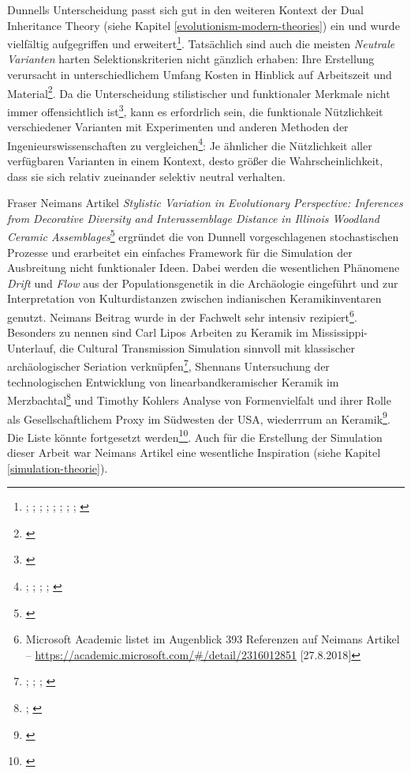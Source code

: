 \documentclass[openany,twoside,twocolumn]{book}
\let\rmarkdownfootnote\footnote%
\def\footnote{\protect\rmarkdownfootnote}
\begin{document}
Dunnells Unterscheidung passt sich gut in den weiteren Kontext der Dual
Inheritance Theory (siehe Kapitel \ref{evolutionism-modern-theories})
ein und wurde vielfältig aufgegriffen und erweitert\footnote{\textcite{lipo_population_1997};
  \textcite{lipo_science_2001}; \textcite{lyman_measuring_2000};
  \textcite{neiman_conspicuous_1997-1};
  \textcite{neiman_stylistic_1995}; \textcite{rindos_darwinian_1985};
  \textcite{rindos_undirected_1989}; \textcite{shennan_ceramic_2001};
  \textcite{teltser_culture_1995}}. Tatsächlich sind auch die meisten
\emph{Neutrale Varianten} harten Selektionskriterien nicht gänzlich
erhaben: Ihre Erstellung verursacht in unterschiedlichem Umfang Kosten
in Hinblick auf Arbeitszeit und Material\footnote{\textcite{meltzer_study_1981}}.
Da die Unterscheidung stilistischer und funktionaler Merkmale nicht
immer offensichtlich ist\footnote{\textcite{bettinger_style_1996}}, kann
es erfordrlich sein, die funktionale Nützlichkeit verschiedener
Varianten mit Experimenten und anderen Methoden der
Ingenieurswissenschaften zu vergleichen\footnote{\textcite{kornbacher_building_2001};
  \textcite{obrien_evolutionary_1994}; \textcite{obrien_variation_1990};
  \textcite{pfeffer_engineering_2001-1};
  \textcite{wilhelmsen_building_2001}}: Je ähnlicher die Nützlichkeit
aller verfügbaren Varianten in einem Kontext, desto größer die
Wahrscheinlichkeit, dass sie sich relativ zueinander selektiv neutral
verhalten.

Fraser Neimans Artikel \emph{Stylistic Variation in Evolutionary
Perspective: Inferences from Decorative Diversity and Interassemblage
Distance in Illinois Woodland Ceramic Assemblages}\footnote{\textcite{neiman_stylistic_1995}}
ergründet die von Dunnell vorgeschlagenen stochastischen Prozesse und
erarbeitet ein einfaches Framework für die Simulation der Ausbreitung
nicht funktionaler Ideen. Dabei werden die wesentlichen Phänomene
\emph{Drift} und \emph{Flow} aus der Populationsgenetik in die
Archäologie eingeführt und zur Interpretation von Kulturdistanzen
zwischen indianischen Keramikinventaren genutzt. Neimans Beitrag wurde
in der Fachwelt sehr intensiv rezipiert\footnote{Microsoft Academic
  listet im Augenblick 393 Referenzen auf Neimans Artikel --
  \url{https://academic.microsoft.com/\#/detail/2316012851}
  {[}27.8.2018{]}}. Besonders zu nennen sind Carl Lipos Arbeiten zu
Keramik im Mississippi-Unterlauf, die Cultural Transmission Simulation
sinnvoll mit klassischer archäologischer Seriation verknüpfen\footnote{\textcite{lipo_community_2001};
  \textcite{lipo_neutralitystyle_2001}; \textcite{lipo_population_1997};
  \textcite{lipo_science_2001}}, Shennans Untersuchung der
technologischen Entwicklung von linearbandkeramischer Keramik im
Merzbachtal\footnote{\textcite{bentley_cultural_2003};
  \textcite{shennan_ceramic_2001}} und Timothy Kohlers Analyse von
Formenvielfalt und ihrer Rolle als Gesellschaftlichem Proxy im Südwesten
der USA, wiederrrum an Keramik\footnote{\textcite{kohler_vessels_2004-1}}.
Die Liste könnte fortgesetzt werden\footnote{\textcite{eerkens_cultural_2005}}.
Auch für die Erstellung der Simulation dieser Arbeit war Neimans Artikel
eine wesentliche Inspiration (siehe Kapitel \ref{simulation-theorie}).
\end{document}
